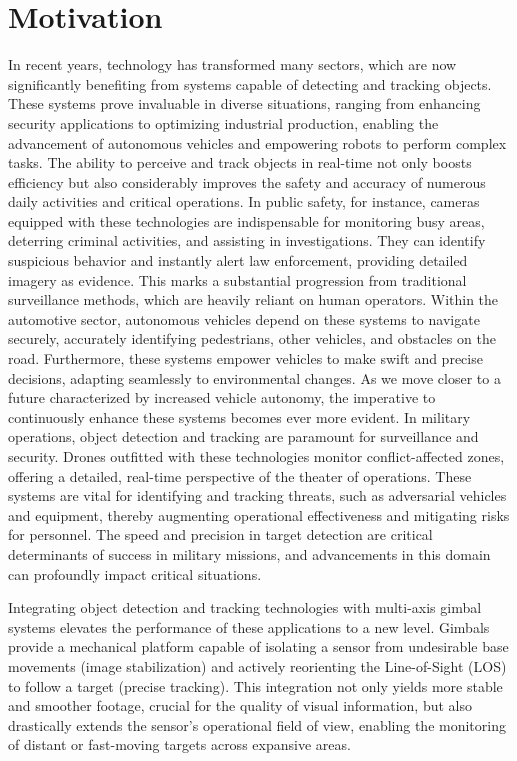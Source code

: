 \section{Motivation}
In recent years, technology has transformed many sectors, which are now significantly benefiting from systems capable of detecting and tracking objects. These systems prove invaluable in diverse situations, ranging from enhancing security applications to optimizing industrial production, enabling the advancement of autonomous vehicles and empowering robots to perform complex tasks. The ability to perceive and track objects in real-time not only boosts efficiency but also considerably improves the safety and accuracy of numerous daily activities and critical operations. In public safety, for instance, cameras equipped with these technologies are indispensable for monitoring busy areas, deterring criminal activities, and assisting in investigations. They can identify suspicious behavior and instantly alert law enforcement, providing detailed imagery as evidence. This marks a substantial progression from traditional surveillance methods, which are heavily reliant on human operators. Within the automotive sector, autonomous vehicles depend on these systems to navigate securely, accurately identifying pedestrians, other vehicles, and obstacles on the road. Furthermore, these systems empower vehicles to make swift and precise decisions, adapting seamlessly to environmental changes. As we move closer to a future characterized by increased vehicle autonomy, the imperative to continuously enhance these systems becomes ever more evident. In military operations, object detection and tracking are paramount for surveillance and security. Drones outfitted with these technologies monitor conflict-affected zones, offering a detailed, real-time perspective of the theater of operations. These systems are vital for identifying and tracking threats, such as adversarial vehicles and equipment, thereby augmenting operational effectiveness and mitigating risks for personnel. The speed and precision in target detection are critical determinants of success in military missions, and advancements in this domain can profoundly impact critical situations.

Integrating object detection and tracking technologies with multi-axis gimbal systems elevates the performance of these applications to a new level. Gimbals provide a mechanical platform capable of isolating a sensor from undesirable base movements (image stabilization) and actively reorienting the Line-of-Sight (LOS) to follow a target (precise tracking). This integration not only yields more stable and smoother footage, crucial for the quality of visual information, but also drastically extends the sensor's operational field of view, enabling the monitoring of distant or fast-moving targets across expansive areas.

